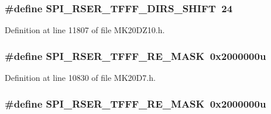 \subsubsection[{\texorpdfstring{S\+P\+I\+\_\+\+R\+S\+E\+R\+\_\+\+T\+F\+F\+F\+\_\+\+D\+I\+R\+S\+\_\+\+S\+H\+I\+FT}{SPI_RSER_TFFF_DIRS_SHIFT}}]{\setlength{\rightskip}{0pt plus 5cm}\#define S\+P\+I\+\_\+\+R\+S\+E\+R\+\_\+\+T\+F\+F\+F\+\_\+\+D\+I\+R\+S\+\_\+\+S\+H\+I\+FT~24}\hypertarget{group___s_p_i___register___masks_ga9f1684fdb2e7f9e9adb7afd07a3278da}{}\label{group___s_p_i___register___masks_ga9f1684fdb2e7f9e9adb7afd07a3278da}


Definition at line 11807 of file M\+K20\+D\+Z10.\+h.

\subsubsection[{\texorpdfstring{S\+P\+I\+\_\+\+R\+S\+E\+R\+\_\+\+T\+F\+F\+F\+\_\+\+R\+E\+\_\+\+M\+A\+SK}{SPI_RSER_TFFF_RE_MASK}}]{\setlength{\rightskip}{0pt plus 5cm}\#define S\+P\+I\+\_\+\+R\+S\+E\+R\+\_\+\+T\+F\+F\+F\+\_\+\+R\+E\+\_\+\+M\+A\+SK~0x2000000u}\hypertarget{group___s_p_i___register___masks_ga1bb1c8b3d77e69e8ea3197b2a26392cb}{}\label{group___s_p_i___register___masks_ga1bb1c8b3d77e69e8ea3197b2a26392cb}


Definition at line 10830 of file M\+K20\+D7.\+h.

\subsubsection[{\texorpdfstring{S\+P\+I\+\_\+\+R\+S\+E\+R\+\_\+\+T\+F\+F\+F\+\_\+\+R\+E\+\_\+\+M\+A\+SK}{SPI_RSER_TFFF_RE_MASK}}]{\setlength{\rightskip}{0pt plus 5cm}\#define S\+P\+I\+\_\+\+R\+S\+E\+R\+\_\+\+T\+F\+F\+F\+\_\+\+R\+E\+\_\+\+M\+A\+SK~0x2000000u}\hypertarget{group___s_p_i___register___masks_ga1bb1c8b3d77e69e8ea3197b2a26392cb}{}\label{group___s_p_i___register___masks_ga1bb1c8b3d77e69e8ea3197b2a26392cb}


